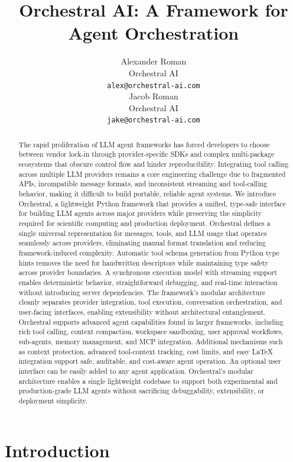 \documentclass{article}
\title{Orchestral AI: A Framework for Agent Orchestration}
\author{%
  Alexander Roman\\
  Orchestral AI\\
  \texttt{alex@orchestral-ai.com} \\
  \And
  Jacob Roman \\
  Orchestral AI \\
  \texttt{jake@orchestral-ai.com} \\
}
\begin{document}
\maketitle

\begin{abstract}
The rapid proliferation of LLM agent frameworks has forced developers to choose between vendor lock-in through provider-specific SDKs and complex multi-package ecosystems that obscure control flow and hinder reproducibility. Integrating tool calling across multiple LLM providers remains a core engineering challenge due to fragmented APIs, incompatible message formats, and inconsistent streaming and tool-calling behavior, making it difficult to build portable, reliable agent systems.
We introduce Orchestral, a lightweight Python framework that provides a unified, type-safe interface for building LLM agents across major providers while preserving the simplicity required for scientific computing and production deployment. Orchestral defines a single universal representation for messages, tools, and LLM usage that operates seamlessly across providers, eliminating manual format translation and reducing framework-induced complexity.
Automatic tool schema generation from Python type hints removes the need for handwritten descriptors while maintaining type safety across provider boundaries. A synchronous execution model with streaming support enables deterministic behavior, straightforward debugging, and real-time interaction without introducing server dependencies. The framework's modular architecture cleanly separates provider integration, tool execution, conversation orchestration, and user-facing interfaces, enabling extensibility without architectural entanglement.
Orchestral supports advanced agent capabilities found in larger frameworks, including rich tool calling, context compaction, workspace sandboxing, user approval workflows, sub-agents, memory management, and MCP integration. Additional mechanisms such as context protection, advanced tool-context tracking, cost limits, and easy LaTeX integration support safe, auditable, and cost-aware agent operation. An optional user interface can be easily added to any agent application.
Orchestral’s modular architecture enables a single lightweight codebase to support both experimental and production-grade LLM agents without sacrificing debuggability, extensibility, or deployment simplicity.
\end{abstract}

\section{Introduction}
\end{document}
